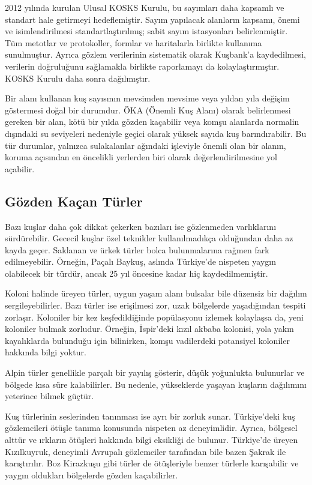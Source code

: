 \documentclass[
  a4paper,
  DIV=11,
  numbers=noendperiod]{scrreprt}
\begin{document}
2012 yılında kurulan Ulusal KOSKS Kurulu, bu sayımları daha kapsamlı ve
standart hale getirmeyi hedeflemiştir. Sayım yapılacak alanların
kapsamı, önemi ve isimlendirilmesi standartlaştırılmış; sabit sayım
istasyonları belirlenmiştir. Tüm metotlar ve protokoller, formlar ve
haritalarla birlikte kullanıma sunulmuştur. Ayrıca gözlem verilerinin
sistematik olarak Kuşbank'a kaydedilmesi, verilerin doğruluğunu
sağlamakla birlikte raporlamayı da kolaylaştırmıştır. KOSKS Kurulu daha
sonra dağılmıştır.

Bir alanı kullanan kuş sayısının mevsimden mevsime veya yıldan yıla
değişim göstermesi doğal bir durumdur. ÖKA (Önemli Kuş Alanı) olarak
belirlenmesi gereken bir alan, kötü bir yılda gözden kaçabilir veya
komşu alanlarda normalin dışındaki su seviyeleri nedeniyle geçici olarak
yüksek sayıda kuş barındırabilir. Bu tür durumlar, yalnızca sulakalanlar
ağındaki işleviyle önemli olan bir alanın, koruma açısından en öncelikli
yerlerden biri olarak değerlendirilmesine yol açabilir.

\subsection*{Gözden Kaçan Türler}\label{guxf6zden-kauxe7an-tuxfcrler}

Bazı kuşlar daha çok dikkat çekerken bazıları ise gözlenmeden
varlıklarını sürdürebilir. Gececil kuşlar özel teknikler kullanılmadıkça
olduğundan daha az kayda geçer. Saklanan ve ürkek türler bolca
bulunmalarına rağmen fark edilmeyebilir. Örneğin, Paçalı Baykuş, aslında
Türkiye'de nispeten yaygın olabilecek bir türdür, ancak 25 yıl öncesine
kadar hiç kaydedilmemiştir.

Koloni halinde üreyen türler, uygun yaşam alanı bulsalar bile düzensiz
bir dağılım sergileyebilirler. Bazı türler ise erişilmesi zor, uzak
bölgelerde yaşadığından tespiti zorlaşır. Koloniler bir kez
keşfedildiğinde popülasyonu izlemek kolaylaşsa da, yeni koloniler bulmak
zorludur. Örneğin, İspir'deki kızıl akbaba kolonisi, yola yakın
kayalıklarda bulunduğu için bilinirken, komşu vadilerdeki potansiyel
koloniler hakkında bilgi yoktur.

Alpin türler genellikle parçalı bir yayılış gösterir, düşük yoğunlukta
bulunurlar ve bölgede kısa süre kalabilirler. Bu nedenle, yükseklerde
yaşayan kuşların dağılımını yeterince bilmek güçtür.

Kuş türlerinin seslerinden tanınması ise ayrı bir zorluk sunar.
Türkiye'deki kuş gözlemcileri ötüşle tanıma konusunda nispeten az
deneyimlidir. Ayrıca, bölgesel alttür ve ırkların ötüşleri hakkında
bilgi eksikliği de bulunur. Türkiye'de üreyen Kızılkuyruk, deneyimli
Avrupalı gözlemciler tarafından bile bazen Şakrak ile karıştırılır. Boz
Kirazkuşu gibi türler de ötüşleriyle benzer türlerle karışabilir ve
yaygın oldukları bölgelerde gözden kaçabilirler.
\end{document}
